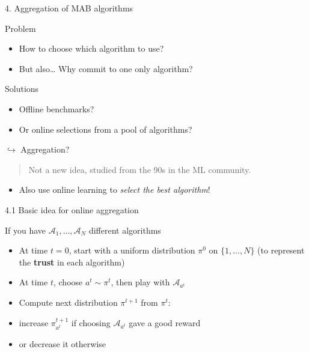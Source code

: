 \documentclass[12pt,english,ignorenonframetext,]{beamer}
\providecommand{\tightlist}{%
  \setlength{\itemsep}{0pt}\setlength{\parskip}{0pt}}
\begin{document}
\begin{frame}{4. Aggregation of MAB algorithms}

\begin{block}{Problem}

\begin{itemize}
\tightlist
\item
  How to choose which algorithm to use?
\item
  But also\ldots{} Why commit to one only algorithm?
\end{itemize}

\end{block}

\begin{block}{Solutions}

\begin{itemize}
\tightlist
\item
  Offline benchmarks?
\item
  Or online selections from a pool of algorithms?
\end{itemize}

\end{block}

\begin{block}{\(\hookrightarrow\) Aggregation?}

\begin{quote}
Not a new idea, studied from the 90s in the ML community.
\end{quote}

\begin{itemize}
\tightlist
\item
  Also use online learning to \emph{select the best algorithm}!
\end{itemize}

\end{block}

\end{frame}



\begin{block}{4.1 Basic idea for online aggregation}

If you have \(\mathcal{A}_1,\ldots,\mathcal{A}_N\) different algorithms

\begin{itemize}
\tightlist
\item
  At time \(t=0\), start with a uniform distribution \(\pi^0\) on
  \(\{1,\ldots,N\}\) (to represent the \textbf{trust} in each algorithm)
\item
  At time \(t\), choose \(a^t \sim \pi^t\), then play with
  \(\mathcal{A}_{a^t}\)
\item
  Compute next distribution \(\pi^{t+1}\) from \(\pi^t\):
\item
  increase \(\pi^{t+1}_{a^t}\) if choosing \(\mathcal{A}_{a^t}\) gave a
  good reward
\item
  or decrease it otherwise
\end{itemize}

\end{block}
\end{document}
